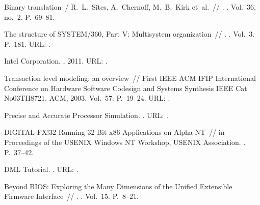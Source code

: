 \begin{thebibliography}{10}
{Binary translation}~/ R.~L.~Sites, A.~Chernoff, M.~B.~Kirk et~al.~//
  . \BibDash
{}. \BibDash
\newblock Vol.~36, no.~2. \BibDash
\newblock P.~69–81.

 {The structure of {SYSTEM/360}, {Part V}: Multisystem
  organization}~// . \BibDash
{}. \BibDash
\newblock Vol.~3. \BibDash
\newblock P.~181. \BibDash
\newblock URL: .

Intel Cor\-po\-ra\-tion. \BibDash
{}, 2011. \BibDash
\newblock URL: .

 {Transaction level modeling: an overview}~// {First
  IEEE ACM IFIP International Conference on Hardware Software Codesign and
  Systems Synthesis IEEE Cat No03TH8721}. \BibDash
\newblock ACM, 2003. \BibDash
\newblock Vol.~57. \BibDash
\newblock P.~19–24. \BibDash
\newblock URL:
  .

 {Precise and Accurate Processor Simulation}. \BibDash
{}. \BibDash
\newblock URL:
  .

 {{DIGITAL FX!32} Running 32-Bit x86
  Applications on {Alpha} {NT}}~// {in Proceedings of the USENIX Windows NT
  Workshop, USENIX Association}. \BibDash
{}. \BibDash
\newblock P.~37–42.

{{DML} Tutorial}. \BibDash
{}. \BibDash
\newblock URL: .

 Beyond {BIOS}: Exploring the Many
  Dimensions of the Unified Extensible Firmware Interface~// . \BibDash
{}. \BibDash
\newblock Vol.~15. \BibDash
\newblock P.~8--21.


\end{thebibliography}
